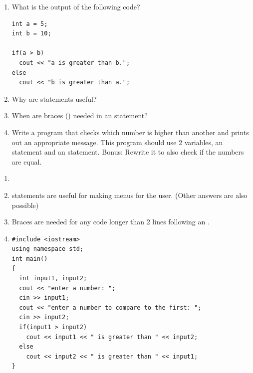 \begin{enumerate}
\item What is the output of the following code?

\noindent\begin{minipage}{\linewidth}\begin{lstlisting}
int a = 5;
int b = 10;

if(a > b)
  cout << "a is greater than b.";
else
  cout << "b is greater than a.";
\end{lstlisting}\end{minipage}

\item Why are  statements useful?

\item When are braces (\Code{\{\}}) needed in an  statement?

\item Write a program that checks which number is higher than another and prints out an appropriate message. This program should use 2 variables, an  statement and an  statement. Bonus: Rewrite it to also check if the numbers are equal.

\end{enumerate}


\begin{enumerate}
\item {}
\item {} statements are useful for making menus for the user. (Other answers are also possible)
\item Braces are needed for any code longer than 2 lines following an .
\item \noindent\begin{minipage}{\linewidth}\begin{lstlisting}
#include <iostream>
using namespace std;
int main()
{
  int input1, input2;
  cout << "enter a number: ";
  cin >> input1;
  cout << "enter a number to compare to the first: ";
  cin >> input2;
  if(input1 > input2)
    cout << input1 << " is greater than " << input2;
  else
    cout << input2 << " is greater than " << input1;
}
\end{lstlisting}\end{minipage}

\end{enumerate}

%

